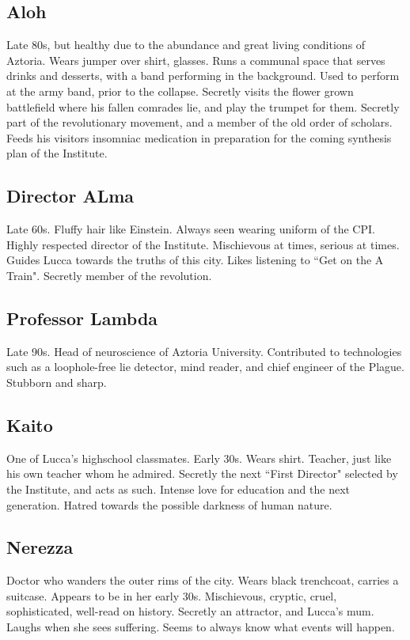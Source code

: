 \documentclass[11pt]{article}
\begin{document}
	\subsection{Aloh}
	Late 80s, but healthy due to the abundance and great living conditions of Aztoria.
	Wears jumper over shirt, glasses.
	Runs a communal space that serves drinks and desserts, with a band performing in the background. 
	Used to perform at the army band, prior to the collapse.
	Secretly visits the flower grown battlefield where his fallen comrades lie, and play the trumpet for them.
	Secretly part of the revolutionary movement, and a member of the old order of scholars.
	Feeds his visitors insomniac medication in preparation for the coming synthesis plan of the Institute.
	\subsection{Director ALma}
	Late 60s. 
	Fluffy hair like Einstein. 
	Always seen wearing uniform of the CPI.
	Highly respected director of the Institute.
	Mischievous at times, serious at times. 
	Guides Lucca towards the truths of this city.
	Likes listening to ``Get on the A Train".
	Secretly member of the revolution.
	\subsection{Professor Lambda}
	Late 90s.
	Head of neuroscience of Aztoria University.
	Contributed to technologies such as a loophole-free lie detector, mind reader, and chief engineer of the Plague.
	Stubborn and sharp.
	\subsection{Kaito}
	One of Lucca's highschool classmates.
	Early 30s.
	Wears shirt.
	Teacher, just like his own teacher whom he admired.
	Secretly the next ``First Director" selected by the Institute, and acts as such.
	Intense love for education and the next generation.
	Hatred towards the possible darkness of human nature.
	\subsection{Nerezza}
	Doctor who wanders the outer rims of the city.
	Wears black trenchcoat, carries a suitcase.
	Appears to be in her early 30s.
	Mischievous, cryptic, cruel, sophisticated, well-read on history.
	Secretly an attractor, and Lucca's mum. 
	Laughs when she sees suffering.
	Seems to always know what events will happen.
	
\end{document}

